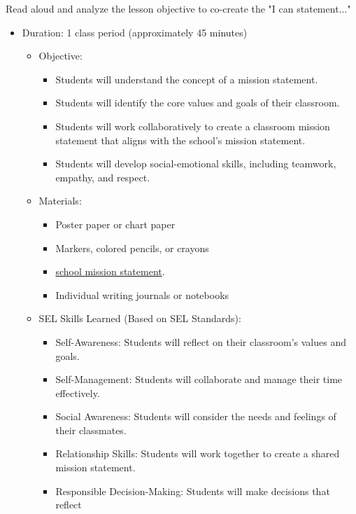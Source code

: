 \documentclass[14pt, letterpaper, twoside]{article}
\begin{document}
Read aloud and analyze the lesson objective to co-create the "I can statement..."
	\begin{itemize}
		\item Duration: 1 class period (approximately 45 minutes)
					\begin{itemize}
						\item Objective:
									\begin{itemize}
										\item Students will understand the concept of a mission statement.
										\item Students will identify the core values and goals of their classroom.
										\item Students will work collaboratively to create a classroom mission statement that aligns
													with the school's mission statement.
										\item Students will develop social-emotional skills, including teamwork, empathy, and
													respect.
									\end{itemize}
						\item Materials:
									\begin{itemize}
										\item Poster paper or chart paper
										\item Markers, colored pencils, or crayons
										\item
													\href{https://www.ps192.org/apps/pages/index.jsp?uREC_ID=1504973&type=d&pREC_ID=1646782}{school mission statement}.
										\item Individual writing journals or notebooks
									\end{itemize}
						\item SEL Skills Learned (Based on SEL Standards):
									\begin{itemize}
										\item Self-Awareness: Students will reflect on their classroom's values and goals.
										\item Self-Management: Students will collaborate and manage their time effectively.
										\item Social Awareness: Students will consider the needs and feelings of their
													classmates.
										\item Relationship Skills: Students will work together to create a shared mission
													statement.
										\item Responsible Decision-Making: Students will make decisions that reflect

\end{itemize}
\end{itemize}
\end{itemize}
\end{document}
